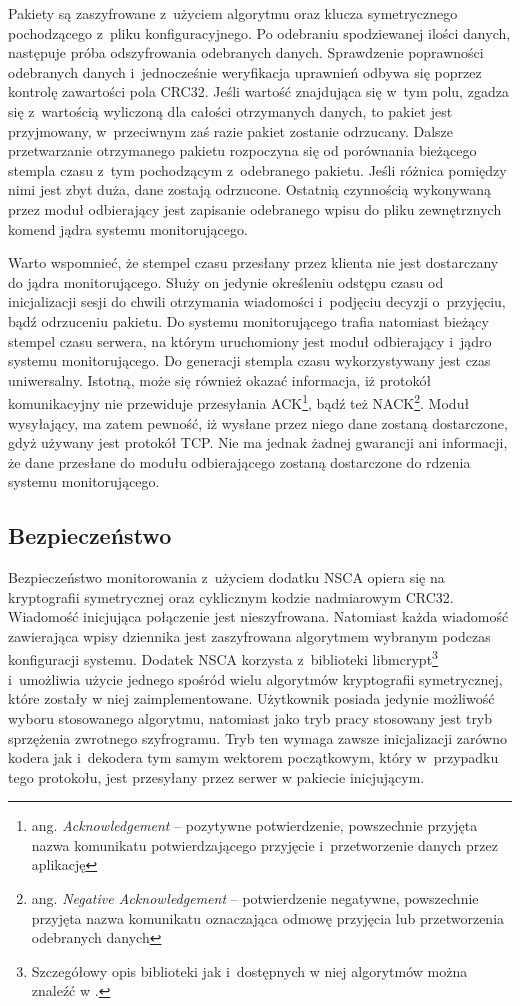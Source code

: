 Pakiety są zaszyfrowane z~użyciem algorytmu oraz klucza symetrycznego
pochodzącego z~pliku konfiguracyjnego. Po odebraniu spodziewanej
ilości danych, następuje próba odszyfrowania odebranych
danych. Sprawdzenie poprawności odebranych danych i~jednocześnie
weryfikacja uprawnień odbywa się poprzez kontrolę zawartości pola
CRC32. Jeśli wartość znajdująca się w~tym polu, zgadza się z~wartością
wyliczoną dla całości otrzymanych danych, to pakiet jest przyjmowany,
w~przeciwnym zaś razie pakiet zostanie odrzucany. Dalsze przetwarzanie
otrzymanego pakietu rozpoczyna się od porównania bieżącego stempla
czasu z~tym pochodzącym z~odebranego pakietu. Jeśli różnica pomiędzy
nimi jest zbyt duża, dane zostają odrzucone. Ostatnią czynnością
wykonywaną przez moduł odbierający jest zapisanie odebranego wpisu do
pliku zewnętrznych komend jądra systemu monitorującego.

Warto wspomnieć, że stempel czasu przesłany przez klienta nie jest
dostarczany do jądra monitorującego. Służy on jedynie określeniu
odstępu czasu od inicjalizacji sesji do chwili otrzymania wiadomości
i~podjęciu decyzji o~przyjęciu, bądź odrzuceniu pakietu. Do systemu
monitorującego trafia natomiast bieżący stempel czasu serwera, na
którym uruchomiony jest moduł odbierający i~jądro systemu
monitorującego. Do generacji stempla czasu wykorzystywany jest czas
uniwersalny. Istotną, może się również okazać informacja, iż protokół
komunikacyjny nie przewiduje przesyłania ACK\footnote {ang. {\em
    Acknowledgement} -- pozytywne potwierdzenie, powszechnie przyjęta
  nazwa komunikatu potwierdzającego przyjęcie i~przetworzenie danych
  przez aplikację}, bądź też NACK\footnote{ang. {\em Negative
    Acknowledgement} -- potwierdzenie negatywne, powszechnie przyjęta
  nazwa komunikatu oznaczająca odmowę przyjęcia lub przetworzenia
  odebranych danych}. Moduł wysyłający, ma zatem pewność, iż wysłane
przez niego dane zostaną dostarczone, gdyż używany jest protokół TCP.
Nie ma jednak żadnej gwarancji ani informacji, że dane przesłane do
modułu odbierającego zostaną dostarczone do rdzenia systemu
monitorującego.

\subsection[Bezpieczeństwo][Bezpieczeństwo]{Bezpieczeństwo}

Bezpieczeństwo monitorowania z~użyciem dodatku NSCA opiera się na
kryptografii symetrycznej oraz cyklicznym kodzie nadmiarowym
CRC32. Wiadomość inicjująca połączenie jest nieszyfrowana. Natomiast
każda wiadomość zawierająca wpisy dziennika jest zaszyfrowana
algorytmem wybranym podczas konfiguracji systemu. Dodatek NSCA
korzysta z~biblioteki libmcrypt\footnote{Szczegółowy opis biblioteki
  jak i~dostępnych w niej algorytmów można znaleźć w
  \cite{www:libmcrypt}.} i~umożliwia użycie jednego spośród wielu
algorytmów kryptografii symetrycznej, które zostały w niej
zaimplementowane. Użytkownik posiada jedynie możliwość wyboru
stosowanego algorytmu, natomiast jako tryb pracy stosowany jest tryb
sprzężenia zwrotnego szyfrogramu. Tryb ten wymaga zawsze inicjalizacji
zarówno kodera jak i~dekodera tym samym wektorem początkowym, który
w~przypadku tego protokołu, jest przesyłany przez serwer w pakiecie
inicjującym.

